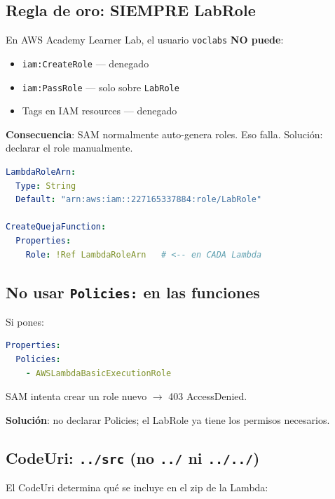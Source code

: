 \documentclass[11pt,a4paper,oneside]{article}
\begin{document}
\subsection{Regla de oro: SIEMPRE LabRole}

\begin{tcolorbox}[colback=warnorange!5!white,colframe=warnorange,title={\textbf{\ding{55} NO crees roles, \ding{51} usa LabRole}}]
En AWS Academy Learner Lab, el usuario \texttt{voclabs} \textbf{NO puede}:
\begin{itemize}
  \item \texttt{iam:CreateRole} --- denegado
  \item \texttt{iam:PassRole} --- solo sobre \texttt{LabRole}
  \item Tags en IAM resources --- denegado
\end{itemize}

\textbf{Consecuencia}: SAM normalmente auto-genera roles. Eso falla. Soluci\'on: declarar el role manualmente.
\end{tcolorbox}

\begin{lstlisting}[language=yaml,caption={C\'omo referenciar LabRole}]
LambdaRoleArn:
  Type: String
  Default: "arn:aws:iam::227165337884:role/LabRole"

CreateQuejaFunction:
  Properties:
    Role: !Ref LambdaRoleArn   # <-- en CADA Lambda
\end{lstlisting}

\subsection{No usar \texttt{Policies:} en las funciones}

Si pones:

\begin{lstlisting}[language=yaml]
Properties:
  Policies:
    - AWSLambdaBasicExecutionRole
\end{lstlisting}

SAM intenta crear un role nuevo $\rightarrow$ 403 AccessDenied.

\textbf{Soluci\'on}: no declarar Policies; el LabRole ya tiene los permisos necesarios.

\subsection{CodeUri: \texttt{../src} (no \texttt{../} ni \texttt{../../})}

El CodeUri determina qu\'e se incluye en el zip de la Lambda:
\end{document}
